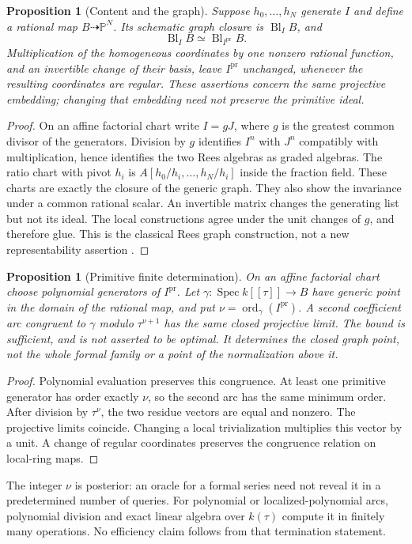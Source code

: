 \documentclass[11pt,reqno]{amsart}
\numberwithin{equation}{section}
\newtheorem{proposition}[theorem]{Proposition}
\theoremstyle{definition}\newtheorem{definition}[theorem]{Definition}
\theoremstyle{remark}\newtheorem{remark}[theorem]{Remark}
\newcommand{\Pj}{\mathbb P}\newcommand{\A}{\mathbb A}
\DeclareMathOperator{\Spec}{Spec}\DeclareMathOperator{\PGL}{PGL}
\begin{document}
\begin{proposition}[Content and the graph]\label{prop:content-v169}
Suppose $h_0,\ldots,h_N$ generate $I$ and define a rational map
$B\dashrightarrow\Pj^N$. Its schematic graph closure is
$\operatorname{Bl}_I B$, and
\[
 \operatorname{Bl}_I B\simeq\operatorname{Bl}_{I^{\mathrm{pr}}}B.
\]
Multiplication of the homogeneous coordinates by one nonzero rational
function, and an invertible change of their basis, leave
$I^{\mathrm{pr}}$ unchanged, whenever the resulting coordinates are
regular. These assertions concern the same projective embedding;
changing that embedding need not preserve the primitive ideal.
\end{proposition}
\begin{proof}
On an affine factorial chart write $I=gJ$, where $g$ is the greatest
common divisor of the generators. Division by $g$ identifies
$I^n$ with $J^n$ compatibly with multiplication, hence identifies the
two Rees algebras as graded algebras. The ratio chart with pivot $h_i$
is $A[h_0/h_i,\ldots,h_N/h_i]$ inside the fraction field. These charts
are exactly the closure of the generic graph. They also show the
invariance under a common rational scalar. An invertible matrix changes
the generating list but not its ideal. The local constructions agree
under the unit changes of $g$, and therefore glue. This is the classical
Rees graph construction, not a new representability assertion
\cite{Stacks169}.
\end{proof}

\begin{proposition}[Primitive finite determination]\label{prop:primitive-jet-v169}
On an affine factorial chart choose polynomial generators of
$I^{\mathrm{pr}}$. Let $\gamma:\Spec k[[\tau]]\to B$ have generic
point in the domain of the rational map, and put
$\nu=\operatorname{ord}_\gamma(I^{\mathrm{pr}})$. A second coefficient
arc congruent to $\gamma$ modulo $\tau^{\nu+1}$ has the same closed
projective limit. The bound is sufficient, and is not asserted to be
optimal. It determines the closed graph point, not the whole formal
family or a point of the normalization above it.
\end{proposition}
\begin{proof}
Polynomial evaluation preserves this congruence. At least one primitive
generator has order exactly $\nu$, so the second arc has the same
minimum order. After division by $\tau^\nu$, the two residue vectors
are equal and nonzero. The projective limits coincide. Changing a local
trivialization multiplies this vector by a unit. A change of regular
coordinates preserves the congruence relation on local-ring maps.
\end{proof}
The integer $\nu$ is posterior: an oracle for a formal series need not
reveal it in a predetermined number of queries. For polynomial or
localized-polynomial arcs, polynomial division and exact linear algebra
over $k(\tau)$ compute it in finitely many operations. No efficiency
claim follows from that termination statement.
\end{document}

